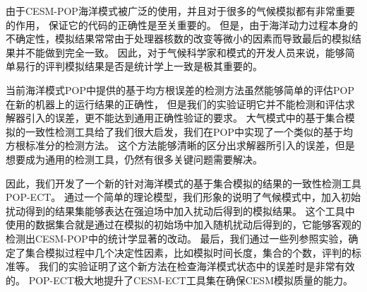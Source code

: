 由于CESM-POP海洋模式被广泛的使用，并且对于很多的气候模拟都有非常重要的作用，
保证它的代码的正确性是至关重要的。 
但是，由于海洋动力过程本身的不确定性，模拟结果常常由于处理器核数的改变等微小的因素而导致最后的模拟结果并不能做到完全一致。
因此，对于气候科学家和模式的开发人员来说，能够简单易行的评判模拟结果是否是统计学上一致是极其重要的。

当前海洋模式POP中提供的基于均方根误差的检测方法虽然能够简单的评估POP在新的机器上的运行结果的正确性，
但是我们的实验证明它并不能检测和评估求解器引入的误差，更不能达到通用正确性验证的要求。
大气模式中的基于集合模拟的一致性检测工具给了我们很大启发，我们在POP中实现了一个类似的基于均方根标准分的检测方法。
这个方法能够清晰的区分出求解器所引入的误差，但是想要成为通用的检测工具，仍然有很多关键问题需要解决。 


因此，我们开发了一个新的针对海洋模式的基于集合模拟的结果的一致性检测工具POP-ECT。
通过一个简单的理论模型，我们形象的说明了气候模式中，加入初始扰动得到的结果集能够表达在强迫场中加入扰动后得到的模拟结果。
这个工具中使用的数据集合就是通过在模拟的初始场中加入随机扰动后得到的，它能够客观的检测出CESM-POP中的统计学显著的改动。
最后，我们通过一些列参照实验，确定了集合模拟过程中几个决定性因素，比如模拟时间长度，集合的个数，评判的标准等。
我们的实验证明了这个新方法在检查海洋模式状态中的误差时是非常有效的。 
POP-ECT极大地提升了CESM-ECT工具集在确保CESM模拟质量的能力。



